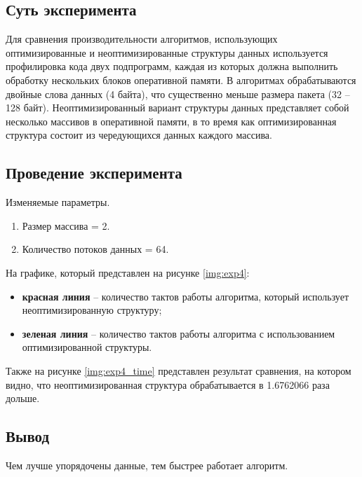 \subsection{Суть эксперимента}  
Для сравнения производительности алгоритмов, использующих оптимизированные и неоптимизированные структуры данных используется профилировка кода двух подпрограмм, каждая из которых должна выполнить обработку нескольких блоков оперативной памяти. В алгоритмах обрабатываются двойные слова данных (4 байта), что существенно меньше размера пакета (32 – 128 байт). Неоптимизированный вариант структуры данных представляет собой несколько массивов в оперативной памяти, в то время как оптимизированная структура состоит из чередующихся данных каждого массива. 


\subsection{Проведение эксперимента}

Изменяемые параметры.

\begin{enumerate}
	\item Размер массива = 2.
	\item Количество потоков данных = 64.
\end{enumerate}

На графике, который представлен на рисунке \ref{img:exp4}:
\begin{itemize}
	\item \textbf{красная линия} -- количество тактов работы алгоритма, который использует неоптимизированную структуру;
	\item \textbf{зеленая линия} -- количество тактов работы алгоритма с использованием оптимизированной структуры.
\end{itemize}





\clearpage


Также на рисунке \ref{img:exp4_time} представлен результат сравнения, на котором видно, что неоптимизированная структура обрабатывается в 1.6762066 раза дольше.


\subsection{Вывод}

Чем лучше упорядочены данные, тем быстрее работает алгоритм.




